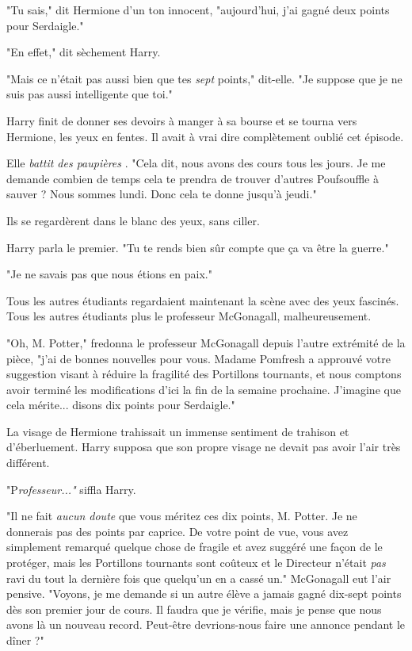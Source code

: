 "Tu sais," dit Hermione d'un ton innocent, "aujourd'hui, j'ai gagné deux points pour Serdaigle."

"En effet," dit sèchement Harry.

"Mais ce n'était pas aussi bien que tes \emph{sept}  points," dit-elle. "Je suppose que je ne suis pas aussi intelligente que toi."

Harry finit de donner ses devoirs à manger à sa bourse et se tourna vers Hermione, les yeux en fentes. Il avait à vrai dire complètement oublié cet épisode.

Elle \emph{battit des paupières} . "Cela dit, nous avons des cours tous les jours. Je me demande combien de temps cela te prendra de trouver d'autres Poufsouffle à sauver ? Nous sommes lundi. Donc cela te donne jusqu'à jeudi."

Ils se regardèrent dans le blanc des yeux, sans ciller.

Harry parla le premier. "Tu te rends bien sûr compte que ça va être la guerre."

"Je ne savais pas que nous étions en paix."

Tous les autres étudiants regardaient maintenant la scène avec des yeux fascinés. Tous les autres étudiants plus le professeur McGonagall, malheureusement.

"Oh, M. Potter," fredonna le professeur McGonagall depuis l'autre extrémité de la pièce, "j'ai de bonnes nouvelles pour vous. Madame Pomfresh a approuvé votre suggestion visant à réduire la fragilité des Portillons tournants, et nous comptons avoir terminé les modifications d'ici la fin de la semaine prochaine. J'imagine que cela mérite... disons dix points pour Serdaigle."

La visage de Hermione trahissait un immense sentiment de trahison et d'éberluement. Harry supposa que son propre visage ne devait pas avoir l'air très différent.

"P\emph{rofesseur..."}  siffla Harry.

"Il ne fait \emph{aucun doute}  que vous méritez ces dix points, M. Potter. Je ne donnerais pas des points par caprice. De votre point de vue, vous avez simplement remarqué quelque chose de fragile et avez suggéré une façon de le protéger, mais les Portillons tournants sont coûteux et le Directeur n'était \emph{pas}  ravi du tout la dernière fois que quelqu'un en a cassé un." McGonagall eut l'air pensive. "Voyons, je me demande si un autre élève a jamais gagné dix-sept points dès son premier jour de cours. Il faudra que je vérifie, mais je pense que nous avons là un nouveau record. Peut-être devrions-nous faire une annonce pendant le dîner ?"

